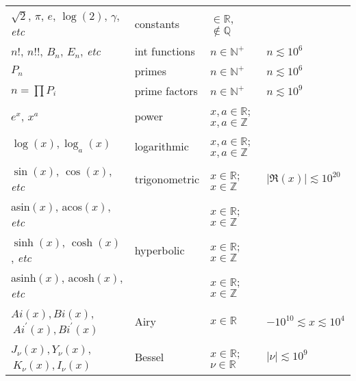 \begin{table}[p]
\begin{center}
\begin{tabular}{l|l|l|l}
$\sqrt{2}$, $\pi$, $e$, $\log(2)$, $\gamma$, {\it etc}
             & constants
             & $\in \mathbb{R}$, $\notin \mathbb{Q}$
             & \ \\

$n!$, $n!!$, $B_{n}$, $E_{n}$, {\it etc}
             & int functions
             & $n \in \mathbb{N}^{+}$
             & $n \lesssim 10^{6}$ \\

$P_{n}$
             & primes
             & $n \in \mathbb{N}^{+}$
             & $n \lesssim 10^{6}$ \\

$n=\prod P_{i}$
             & prime factors
             & $n \in \mathbb{N}^{+}$
             & $n \lesssim 10^{9}$ \\

$e^x$, $x^a$
             & power
             & $x, a \in \mathbb{R}$; $x, a \in \mathbb{Z}$
             & \ \\

$\log(x), \log_{a}(x)$
             & logarithmic
             & $x, a \in \mathbb{R}$; $x, a \in \mathbb{Z}$
             & \ \\

$\sin(x)$, $\cos(x)$, {\it etc}
             & trigonometric
             & $x \in \mathbb{R}$; $x \in \mathbb{Z}$
             & $\left|\Re(x)\right| \lesssim 10^{20}$ \\

asin$(x)$, acos$(x)$, {\it etc}
             & \ %
             & $x \in \mathbb{R}$; $x \in \mathbb{Z}$
             & \ \\

$\sinh(x)$, $\cosh(x)$, {\it etc}
             & hyperbolic
             & $x \in \mathbb{R}$; $x \in \mathbb{Z}$
             & \ \\

asinh$(x)$, acosh$(x)$, {\it etc}
             & \ %
             & $x \in \mathbb{R}$; $x \in \mathbb{Z}$
             & \ \\

$Ai(x)$,$\,Bi(x)$,$\,Ai^{\prime}(x)$,$\,Bi^{\prime}(x)$
             & Airy
             & $x \in \mathbb{R}$
             & $-10^{10} \lesssim x \lesssim 10^{4}$ \\

$J_{\nu}(x)$,$\,Y_{\nu}(x)$,$\,K_{\nu}(x)$,$\,I_{\nu}(x)$
             & Bessel
             & $x \in \mathbb{R}$; $\nu \in \mathbb{R}$
             & $\left|\nu\right| \lesssim 10^{9}$ \\


\end{tabular}
\end{center}
\end{table}
